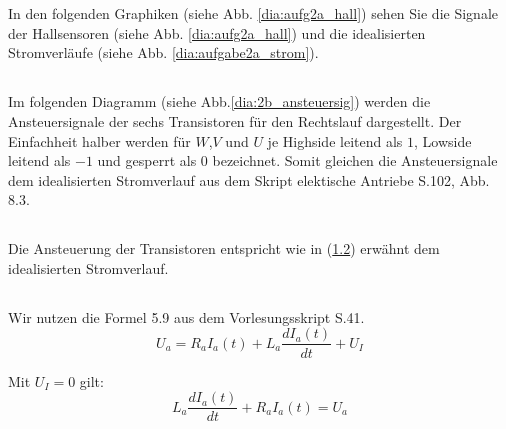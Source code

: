 %
%
%
%
\chapter{}\label{ex:aufg2}
%
%
\section{}\label{sec:aufg2a}
%
In den folgenden Graphiken (siehe Abb. \ref{dia:aufg2a_hall}) sehen Sie die Signale der Hallsensoren (siehe Abb. \ref{dia:aufg2a_hall}) und die idealisierten Stromverläufe (siehe Abb. \ref{dia:aufgabe2a_strom}).


\newpage
%
%
%
\section{}\label{sec:aufg2b}
%
Im folgenden Diagramm (siehe Abb.\ref{dia:2b_ansteuersig}) werden die Ansteuersignale der sechs Transistoren für den Rechtslauf dargestellt. Der Einfachheit halber werden für $W$,$V$ und $U$ je Highside leitend als $1$, Lowside leitend als $-1$ und gesperrt als $0$ bezeichnet. Somit gleichen die Ansteuersignale dem idealisierten Stromverlauf aus dem Skript elektische Antriebe S.102, Abb. 8.3.

%
\section{}\label{sec:aufg2c}
%
Die Ansteuerung der Transistoren entspricht wie in (\ref{sec:aufg2b}) erwähnt  dem idealisierten Stromverlauf.

%
\newpage
\section{}\label{sec:aufg2d}
%
Wir nutzen die Formel 5.9 aus dem Vorlesungsskript S.41.
\begin{equation}
	U_a = R_a I_a(t) + L_a \frac{dI_a(t)}{dt} + U_I
	\label{for:formel1}
\end{equation}

Mit $U_I = 0$ gilt:
\begin{equation}
    L_a\frac{dI_a(t)}{dt} + R_a I_a(t) = U_a
	\label{for:formel2}
\end{equation}

